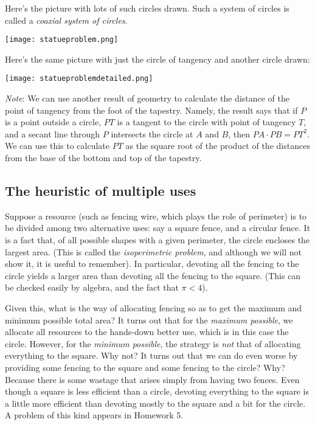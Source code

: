 \documentclass[10pt]{amsart}
\begin{document}
Here's the picture with lots of such circles drawn. Such a system of
circles is called a {\em coaxial system of circles}.

\texttt{[image: statueproblem.png]}

Here's the same picture with just the circle of tangency and another
circle drawn:

\texttt{[image: statueproblemdetailed.png]}

{\em Note}: We can use another result of geometry to calculate the
distance of the point of tangency from the foot of the
tapestry. Namely, the result says that if $P$ is a point outside a
circle, $PT$ is a tangent to the circle with point of tangency $T$,
and a secant line through $P$ intersects the circle at $A$ and $B$,
then $PA \cdot PB = PT^2$. We can use this to calculate $PT$ as the
square root of the product of the distances from the base of the
bottom and top of the tapestry.
\subsection{The heuristic of multiple uses}

Suppose a resource (such as fencing wire, which plays the role of
perimeter) is to be divided among two alternative uses: say a square
fence, and a circular fence. It is a fact that, of all possible shapes
with a given perimeter, the circle encloses the largest area. (This is
called the {\em isoperimetric problem}, and although we will not show
it, it is useful to remember). In particular, devoting all the fencing
to the circle yields a larger area than devoting all the fencing to
the square. (This can be checked easily by algebra, and the fact that
$\pi < 4$).

Given this, what is the way of allocating fencing so as to get the
maximum and minimum possible total area? It turns out that for the
{\em maximum possible}, we allocate all resources to the hands-down
better use, which is in this case the circle. However, for the {\em
minimum possible}, the strategy is {\em not} that of allocating
everything to the square. Why not? It turns out that we can do even
worse by providing some fencing to the square and some fencing to the
circle? Why? Because there is some wastage that arises simply from
having two fences. Even though a square is less efficient than a
circle, devoting everything to the square is a little more efficient
than devoting mostly to the square and a bit for the circle. A problem
of this kind appears in Homework 5.
\end{document}
